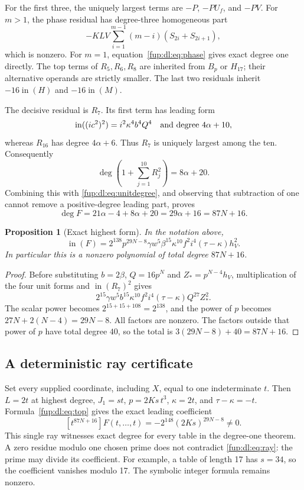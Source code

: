 \documentclass[11pt,letterpaper]{article}
\newtheorem{proposition}[theorem]{Proposition}
\theoremstyle{definition}\newtheorem{definition}[theorem]{Definition}
\theoremstyle{remark}\newtheorem{remark}[theorem]{Remark}
\newcommand{\topf}[1]{\operatorname{in}(#1)}
\begin{document}
For the first three, the uniquely largest terms are $-P$, $-PU_f$, and $-PV$. For $m>1$, the phase residual has degree-three homogeneous part
\[
 -KLV\sum_{i=1}^{m-1}(m-i)(S_{2i}+S_{2i+1}),
\]
which is nonzero. For $m=1$, equation~\eqref{fup:dl:eq:phase} gives exact degree one directly. The top terms of $R_5,R_6,R_8$ are inherited from $B_p$ or $H_{17}$; their alternative operands are strictly smaller. The last two residuals inherit $-16\topf{H}$ and $-16\topf{M}$.

The decisive residual is $R_7$. Its first term has leading form
\[
 \topf{(ic^2)^2}=i^2\kappa^4b^4Q^4
 \quad\hbox{and degree }4\alpha+10,
\]
whereas $R_{16}$ has degree $4\alpha+6$. Thus $R_7$ is uniquely largest among the ten. Consequently
\[
 \deg\left(1+\sum_{j=1}^{10}R_j^2\right)=8\alpha+20.
\]
Combining this with \eqref{fup:dl:eq:unitdegree}, and observing that subtraction of one cannot remove a positive-degree leading part, proves
\[
 \deg F=21\alpha-4+8\alpha+20=29\alpha+16=87N+16.
\]

\begin{proposition}[Exact highest form]\label{fup:dl:prop:top}
In the notation above,
\begin{equation}\label{fup:dl:eq:top}
 \boxed{\topf{F}=2^{138}p^{29N-8}\gamma w^5\beta^{15}
 \kappa^{10}f^2i^4(\tau-\kappa)h_V^2.}
\end{equation}
In particular this is a nonzero polynomial of total degree $87N+16$.
\end{proposition}
\begin{proof}
Before substituting $b=2\beta$, $Q=16p^N$ and $Z_*=p^{N-4}h_V$, multiplication of the four unit forms and $\topf{R_7}^2$ gives
\[
 2^{15}\gamma w^5b^{15}\kappa^{10}f^2i^4
       (\tau-\kappa)Q^{27}Z_*^2.
\]
The scalar power becomes $2^{15+15+108}=2^{138}$, and the power of $p$ becomes $27N+2(N-4)=29N-8$. All factors are nonzero. The factors outside that power of $p$ have total degree $40$, so the total is $3(29N-8)+40=87N+16$.
\end{proof}

\subsection{A deterministic ray certificate}
Set every supplied coordinate, including $X$, equal to one indeterminate $t$. Then $L=2t$ at highest degree, $J_1=st$, $p=2Ks\,t^3$, $\kappa=2t$, and $\tau-\kappa=-t$. Formula~\eqref{fup:dl:eq:top} gives the exact leading coefficient
\begin{equation}\label{fup:dl:eq:ray}
 [t^{87N+16}]F(t,\ldots,t)
 =-2^{148}(2Ks)^{29N-8}\ne0.
\end{equation}
This single ray witnesses exact degree for every table in the degree-one theorem. A zero residue modulo one chosen prime does not contradict \eqref{fup:dl:eq:ray}: the prime may divide its coefficient. For example, a table of length 17 has $s=34$, so the coefficient vanishes modulo 17. The symbolic integer formula remains nonzero.
\end{document}
